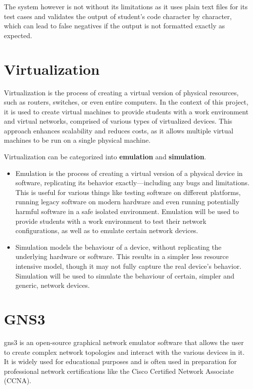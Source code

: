 The system however is not without its limitations as it uses plain text files for its test cases and validates the output 
of student's code character by character, which can lead to false negatives if the output is not formatted exactly as
expected.

\section{Virtualization}
Virtualization is the process of creating a virtual version of physical resources, such as routers, switches, or even
entire computers. In the context of this project, it is used to create virtual machines to provide students with a 
work environment and virtual networks, comprised of various types of virtualized devices. This approach enhances scalability 
and reduces costs, as it allows multiple virtual machines to be run on a single physical machine.

Virtualization can be categorized into \textbf{emulation} and \textbf{simulation}. 

\begin{itemize}
  \item Emulation is the process of creating a virtual version of a physical device in software, replicating its 
  behavior exactly—including any bugs and limitations. This is useful for various things like testing software on 
  different platforms, running legacy software on modern hardware and even running potentially harmful software in a safe 
  isolated environment.
  Emulation will be used to provide students with a work environment to test their network configurations,
  as well as to emulate certain network devices.
  \item Simulation models the behaviour of a device, without replicating the underlying hardware or software.
  This results in a simpler less resource intensive model, though it may not fully capture the real device's behavior.
  Simulation will be used to simulate the behaviour of certain, simpler and generic, network devices.

\end{itemize}


\section{GNS3}
\ac{gns3} is an open-source graphical network emulator software that allows the user to create complex network topologies 
and interact with the various devices in it. It is widely used for educational purposes and is often used in preparation 
for professional network certifications like the Cisco Certified Network Associate (CCNA).

